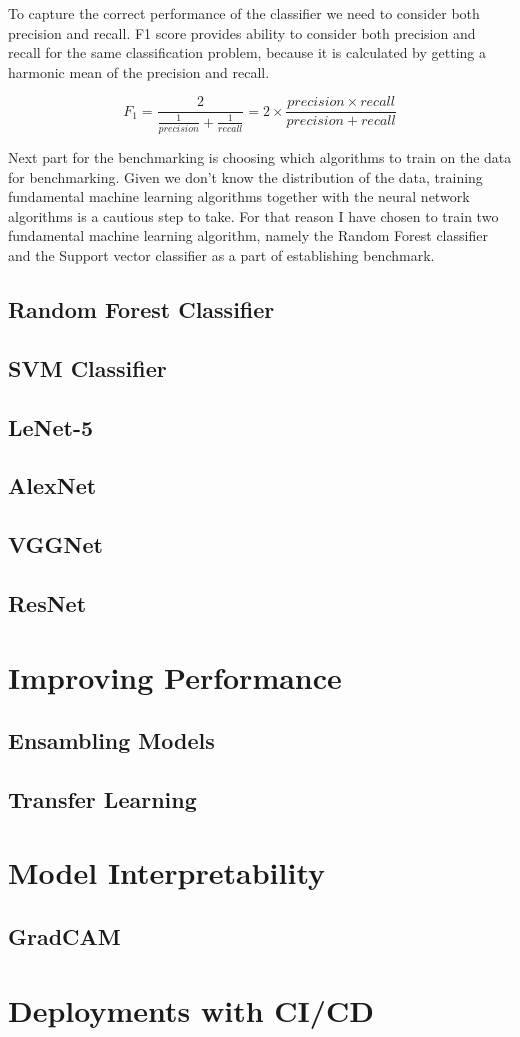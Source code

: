 To capture the correct performance of the classifier we need to consider both precision and recall.
F1 score provides ability to consider both precision and recall for the same classification problem, because it is calculated by getting a harmonic mean of the precision and recall.

\begin{equation}
    F_1 = \frac{2}{\frac{1}{precision} + \frac{1}{recall}} = 2 \times \frac{precision \times recall}{precision + recall}
\end{equation}


Next part for the benchmarking is choosing which algorithms to train on the data for benchmarking.
Given we don't know the distribution of the data, training fundamental machine learning algorithms together with the neural network algorithms is a cautious step to take. 
For that reason I have chosen to train two fundamental machine learning algorithm, namely the Random Forest classifier and the Support vector classifier as a part of establishing benchmark.


\subsection{Random Forest Classifier}

\subsection{SVM Classifier}

\subsection{LeNet-5}

\subsection{AlexNet}

\subsection{VGGNet}

\subsection{ResNet}

\section{Improving Performance}
\subsection{Ensambling Models}
\subsection{Transfer Learning}

\section{Model Interpretability}
\subsection{GradCAM}

\section{Deployments with CI/CD}

